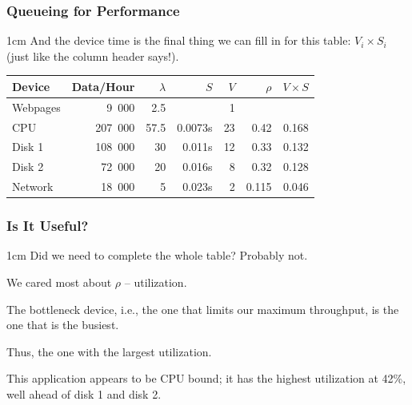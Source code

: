 \begin{frame}
\frametitle{Queueing for Performance}

\begin{changemargin}{1cm}
\large 
And the device time is the final thing we can fill in for this table: $V_{i} \times S_{i}$ (just like the column header says!).
\end{changemargin}

\begin{center}
\begin{tabular}{l|r|r|r|r|r|r} 
	\textbf{Device} & \textbf{Data/Hour} & \textbf{$\lambda$} & \textbf{$S$} & \textbf{$V$} & \textbf{$\rho$} & \textbf{$V \times S$} \\ \hline
	Webpages & 9~000 & 2.5 & & 1 & & \\ \hline
	CPU & 207~000 & 57.5 & 0.0073s & 23 & 0.42 & 0.168\\ \hline
	Disk 1 & 108~000 & 30 & 0.011s  & 12& 0.33 & 0.132\\ \hline
	Disk 2 & 72~000 & 20 & 0.016s & 8 & 0.32 & 0.128\\ \hline
	Network & 18~000 & 5 & 0.023s & 2 & 0.115 & 0.046\\ 
\end{tabular}
\end{center}

\end{frame}



\begin{frame}
\frametitle{Is It Useful?}

\begin{changemargin}{1cm}
\large 
Did we need to complete the whole table? Probably not. 

We cared most about $\rho$ -- utilization. 

The bottleneck device, i.e., the one that limits our maximum throughput, is the one that is the busiest. 

Thus, the one with the largest utilization. 

This application appears to be CPU bound; it has the highest utilization at 42\%, well ahead of disk 1 and disk 2. 
\end{changemargin}

\end{frame}



